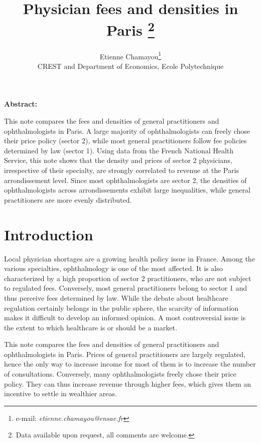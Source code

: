 \documentclass[11pt]{article}
\begin{document}
\title{Physician fees and densities in Paris%
\thanks{Data available upon request, all comments are welcome.%
}}

\author{Etienne Chamayou\thanks{e-mail:
\textit{etienne.chamayou@ensae.fr}}\medskip\\{\normalsize CREST and Department of Economics, Ecole Polytechnique }}
\maketitle

\sloppy%

\onehalfspacing

\textbf{Abstract:}

This note compares the fees and densities of general practitioners and ophthalmologists in Paris. A large majority of ophthalmologists can freely chose their price policy (sector 2), while most general practitioners follow fee policies determined by law (sector 1). Using data from the French National Health Service, this note shows that the density and prices of sector 2 physicians, irrespective of their specialty, are strongly correlated to revenue at the Paris arrondissement level. Since most ophthalmologists are sector 2, the densities of ophthalmologists across arrondissements exhibit large inequalities, while general practitioners are more evenly distributed.

\strut

\pagebreak%
\doublespacing

\section{Introduction}

Local physician shortages are a growing health policy issue in France. Among the various specialties, ophthalmology is one of the most affected. It is also characterized by a high proportion of sector 2 practitioners, who are not subject to regulated fees. Conversely, most general practitioners belong to sector 1 and thus perceive fees determined by law. While the debate about healthcare regulation certainly belongs in the public sphere, the scarcity of information makes it difficult to develop an informed opinion. A most controversial issue is the extent to which healthcare is or should be a market.

This note compares the fees and densities of general practitioners and ophthalmologists in Paris. Prices of general practitioners are largely regulated, hence the only way to increase income for most of them is to increase the number of consultations. Conversely, many ophthalmologists freely chose their price policy. They can thus increase revenue through higher fees, which gives them an incentive to settle in wealthier areas.
\end{document}
